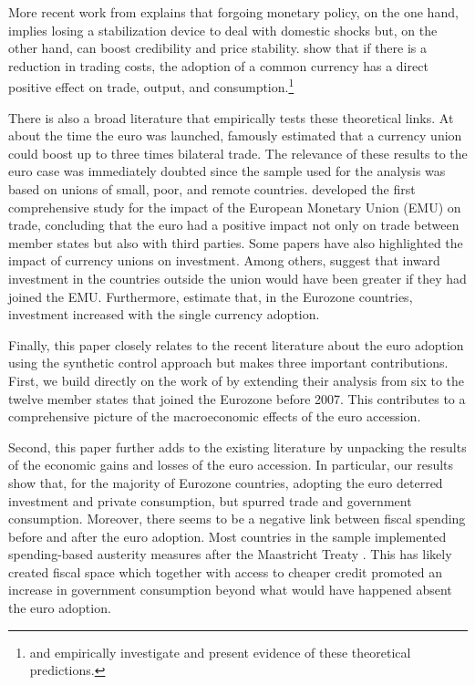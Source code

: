 \documentclass[12pt]{article}
\begin{document}
More recent work from \cite{Alesina2002} explains that forgoing monetary policy, on the one hand, implies losing a stabilization device to deal with domestic shocks but, on the other hand, can boost credibility and price stability. \cite{Alesina2002} show that if there is a reduction in trading costs, the adoption of a common currency has a direct positive effect on trade, output, and consumption.\footnote{\cite{Alesina2002B} and \cite{Barro2007} empirically investigate and present evidence of these theoretical predictions.}

There is also a broad literature that empirically tests these theoretical links. At about the time the euro was launched, \cite{Rose2000} famously estimated that a currency union could boost up to three times bilateral trade. The relevance of these results to the euro case was immediately doubted since the sample used for the analysis was based on unions of small, poor, and remote countries. \cite{Micco2003} developed the first comprehensive study for the impact of the European Monetary Union (EMU) on trade, concluding that the euro had a positive impact not only on trade between member states but also with third parties. Some papers have also highlighted the impact of currency unions on investment. Among others, \cite{Barr2003} suggest that inward investment in the countries outside the union would have been greater if they had joined the EMU. Furthermore, \cite{DeSousa2011} estimate that, in the Eurozone countries, investment increased with the single currency adoption.

Finally, this paper closely relates to the recent literature about the euro adoption using the synthetic control approach \citep{Fernandez2015, Verstegen2017, Gasparotti2019} but makes three important contributions. First, we build directly on the work of \cite{Puzzello2018} by extending their analysis from six to the twelve member states that joined the Eurozone before 2007. This contributes to a comprehensive picture of the macroeconomic effects of the euro accession. 

Second, this paper further adds to the existing literature by unpacking the results of the economic gains and losses of the euro accession. In particular, our results show that, for the majority of Eurozone countries, adopting the euro deterred investment and private consumption, but spurred trade and government consumption. Moreover, there seems to be a negative link between fiscal spending before and after the euro adoption. Most countries in the sample implemented spending-based austerity measures after the Maastricht Treaty \citep{Alesina2019}. This has likely created fiscal space which together with access to cheaper credit promoted an increase in government consumption beyond what would have happened absent the euro adoption. %
\end{document}

